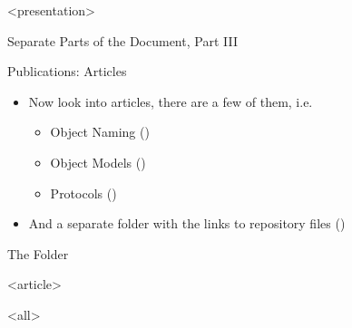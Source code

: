 \mode
<presentation>

\begin{frame}{Separate Parts of the Document, Part III}
  \label{separate:parts:pc2}

  Publications: Articles

  \begin{itemize}
    \item Now look into articles, there are a few of them, i.e.
      \begin{itemize}
        \item Object Naming ()
        \item Object Models ()
        \item Protocols ()
      \end{itemize}
    \item And a separate folder with the links to repository files ()
  \end{itemize}

  \begin{block}{The Folder }
  \end{block}

\end{frame}




\mode
<article>

\bigskip


\clearpage

\mode
<all>